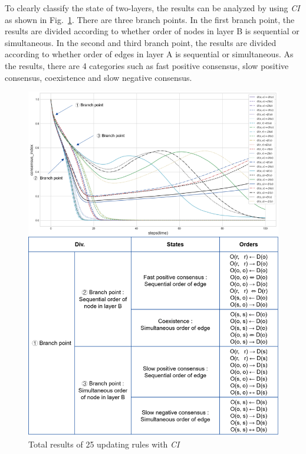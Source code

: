 To clearly classify the state of two-layers, the results can be analyzed by using \textit{CI} as shown in Fig.~\ref{ordertotal2}. There are three branch points. In the first branch point, the results are divided according to whether order of nodes in layer B is sequential or simultaneous. In the second and third branch point, the results are divided according to whether order of edges in layer A is sequential or simultaneous. As the results, there are 4 categories such as fast positive consensus, slow positive consensus, coexistence and slow negative consensus. 
\begin{figure}[!htb]
	\centering
	\includegraphics[width=\hsize]{figure/ordertotal2.png}
	\caption{Total results of 25 updating rules with \textit{CI}}
	\label{ordertotal2}
\end{figure}

